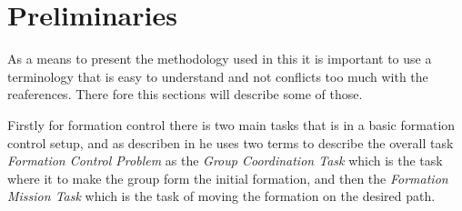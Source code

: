 \section{Preliminaries}
As a means to present the methodology used in this it is important
to use a terminology that is easy to understand and not conflicts too
much with the reaferences. There fore this sections will describe some
of those.

Firstly for formation control there is two main tasks that is in a
basic formation control setup, and as describen in \citep{thorvaldsen}
he uses two terms to describe the overall task \textit{Formation
Control Problem} as the  \textit{Group Coordination Task} which is the
task where it to make the group form the initial formation, and then
the \textit{Formation Mission Task} which is the task of moving the
formation on the desired path. 

